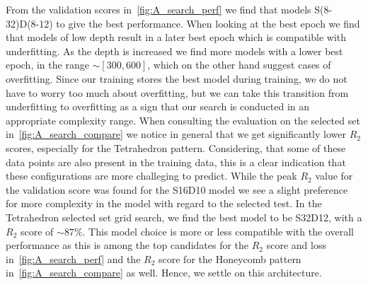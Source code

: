 From the validation scores in~\cref{fig:A_search_perf} we find that models
S(8-32)D(8-12) to give the best performance. When looking at the best epoch we
find that models of low depth result in a later best epoch which is compatible
with underfitting. As the depth is increased we find more models with a lower
best epoch, in the range $\sim [300, 600]$, which on the other hand suggest
cases of overfitting. Since our training stores the best model during training,
we do not have to worry too much about overfitting, but we can take this
transition from underfitting to overfitting as a sign that our search is
conducted in an appropriate complexity range. When consulting the evaluation on the
selected set in~\cref{fig:A_search_compare} we notice in general that we get
significantly lower $R_2$ scores, especially for the Tetrahedron pattern. Considering, that some of these data points are also present in the training data, this is a clear indication that these configurations are more challeging to predict. While the peak $R_2$ value for the validation score was found for the S16D10 model we see a slight preference for more complexity in the model with regard to the selected test. In the Tetrahedron selected set grid search, we find the best model to be S32D12, with a $R_2$ score of $\sim 87 \%$. This model choice is more or less compatible with the overall performance as this is among the top candidates for the $R_2$ score and loss in~\cref{fig:A_search_perf} and the $R_2$ score for the Honeycomb pattern in~\cref{fig:A_search_compare} as well. Hence, we settle on this architecture.


